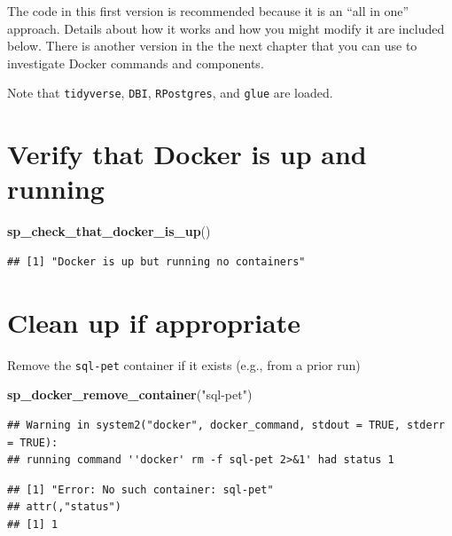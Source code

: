\documentclass[]{book}
\newenvironment{Shaded}{\begin{snugshade}}{\end{snugshade}}
\newcommand{\KeywordTok}[1]{\textcolor[rgb]{0.13,0.29,0.53}{\textbf{#1}}}
\newcommand{\NormalTok}[1]{#1}
\newcommand{\StringTok}[1]{\textcolor[rgb]{0.31,0.60,0.02}{#1}}
\theoremstyle{definition}
\theoremstyle{definition}
\theoremstyle{definition}
\theoremstyle{remark}
\begin{document}
The code in this first version is recommended because it is an ``all in
one'' approach. Details about how it works and how you might modify it
are included below. There is another version in the the next chapter
that you can use to investigate Docker commands and components.

Note that \texttt{tidyverse}, \texttt{DBI}, \texttt{RPostgres}, and
\texttt{glue} are loaded.

\hypertarget{verify-that-docker-is-up-and-running}{%
\section{Verify that Docker is up and
running}\label{verify-that-docker-is-up-and-running}}

\begin{Shaded}
\begin{Highlighting}[]
\KeywordTok{sp_check_that_docker_is_up}\NormalTok{()}
\end{Highlighting}
\end{Shaded}

\begin{verbatim}
## [1] "Docker is up but running no containers"
\end{verbatim}

\hypertarget{clean-up-if-appropriate-1}{%
\section{Clean up if appropriate}\label{clean-up-if-appropriate-1}}

Remove the \texttt{sql-pet} container if it exists (e.g., from a prior
run)

\begin{Shaded}
\begin{Highlighting}[]
\KeywordTok{sp_docker_remove_container}\NormalTok{(}\StringTok{"sql-pet"}\NormalTok{)}
\end{Highlighting}
\end{Shaded}

\begin{verbatim}
## Warning in system2("docker", docker_command, stdout = TRUE, stderr = TRUE):
## running command ''docker' rm -f sql-pet 2>&1' had status 1
\end{verbatim}

\begin{verbatim}
## [1] "Error: No such container: sql-pet"
## attr(,"status")
## [1] 1
\end{verbatim}
\end{document}
